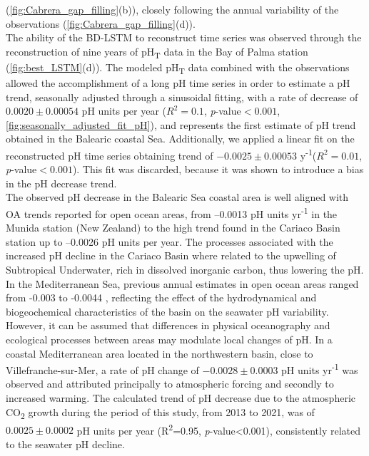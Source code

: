 (\cref{fig:Cabrera_gap_filling}(b)), closely following the annual variability
of the observations (\cref{fig:Cabrera_gap_filling}(d)).\\
The ability of the BD-LSTM to reconstruct time series was observed through
the reconstruction of nine years of pH\textsubscript{T} data in the Bay of
Palma station (\cref{fig:best_LSTM}(d)). The modeled pH\textsubscript{T} data
combined with the observations allowed the accomplishment of a long pH time
series in order to estimate a pH trend, seasonally adjusted through a
sinusoidal fitting, with a rate of decrease of $0.0020\pm 0.00054$ pH units per
year ($R^2=0.1$, \emph{p}-value$<0.001$,
\cref{fig:seasonally_adjusted_fit_pH}), and represents the first estimate of pH
trend obtained in the Balearic coastal Sea. Additionally, we applied a linear
fit on the reconstructed pH time series obtaining trend of $-0.0025\pm 0.00053$
y\textsuperscript{-1}($R^2=0.01$, \emph{p}-value$<0.001$). This fit was
discarded, because it was shown to introduce a bias in the pH decrease trend.
\\
The observed pH decrease in the Balearic Sea coastal area is well aligned
with OA trends reported for open ocean areas, from –0.0013 pH units
yr\textsuperscript{-1} in the Munida station (New Zealand) to the high trend
found in the Cariaco Basin station up to –0.0026 pH units per
year\cite{Bates2014}. The processes associated with the increased pH decline in
the Cariaco Basin where related to the upwelling of Subtropical Underwater,
rich in dissolved inorganic carbon, thus lowering the pH.\\
In the Mediterranean Sea, previous annual estimates in open ocean areas
ranged from -0.003 to -0.0044 \cite{yao2016,Flecha2015}, reflecting the effect
of the hydrodynamical and biogeochemical characteristics of the basin on the
seawater pH variability\cite{lee2011,Palmieri2015,schneider2010}. However, it
can be assumed that differences in physical oceanography and ecological
processes between areas may modulate local changes of pH. In a coastal
Mediterranean area located in the northwestern basin, close to
Villefranche-sur-Mer, a rate of pH change of $-0.0028\pm 0.0003$ pH units
yr\textsuperscript{-1} was observed\cite{Kapsenberg2017} and attributed
principally to atmospheric forcing and secondly to increased warming.
The calculated trend of pH decrease due to the atmospheric
CO\textsubscript{2} growth during the period of this study, from 2013 to 2021,
was of $0.0025\pm 0.0002$ pH units per year (R\textsuperscript{2}=0.95,
\emph{p}-value<0.001), consistently related to the seawater pH decline.
